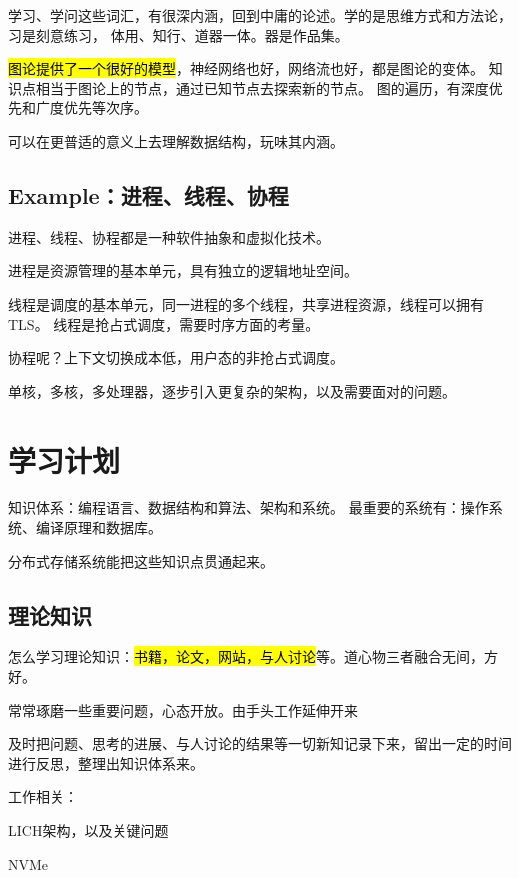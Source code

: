 学习、学问这些词汇，有很深内涵，回到中庸的论述。学的是思维方式和方法论，习是刻意练习，
体用、知行、道器一体。器是作品集。

\hl{图论提供了一个很好的模型}，神经网络也好，网络流也好，都是图论的变体。
知识点相当于图论上的节点，通过已知节点去探索新的节点。
图的遍历，有深度优先和广度优先等次序。

可以在更普适的意义上去理解数据结构，玩味其内涵。

\subsection{Example：进程、线程、协程}

进程、线程、协程都是一种软件抽象和虚拟化技术。

进程是资源管理的基本单元，具有独立的逻辑地址空间。

线程是调度的基本单元，同一进程的多个线程，共享进程资源，线程可以拥有TLS。
线程是抢占式调度，需要时序方面的考量。

协程呢？上下文切换成本低，用户态的非抢占式调度。

单核，多核，多处理器，逐步引入更复杂的架构，以及需要面对的问题。


\section{学习计划}

知识体系：编程语言、数据结构和算法、架构和系统。
最重要的系统有：操作系统、编译原理和数据库。

分布式存储系统能把这些知识点贯通起来。

\subsection{理论知识}

怎么学习理论知识：\hl{书籍，论文，网站，与人讨论}等。道心物三者融合无间，方好。

常常琢磨一些重要问题，心态开放。由手头工作延伸开来

及时把问题、思考的进展、与人讨论的结果等一切新知记录下来，留出一定的时间进行反思，整理出知识体系来。

工作相关：
\begin{enumbox}
\item LICH架构，以及关键问题
\item NVMe
\end{enumbox}

